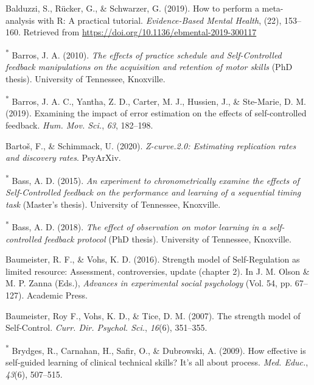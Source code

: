 \documentclass[
  english,
  man, donotrepeattitle,floatsintext]{apa7}
\newlength{\cslhangindent}
\newlength{\cslentryspacingunit} %
\newenvironment{CSLReferences}[2] %
 {%
  \setlength{\parindent}{0pt}
  \ifodd #1
  \let\oldpar\par
  \def\par{\hangindent=\cslhangindent\oldpar}
  \fi
  \setlength{\parskip}{#2\cslentryspacingunit}
 }%
 {}
\begin{document}
\begin{CSLReferences}{1}{0}
\leavevmode{}%
Balduzzi, S., Rücker, G., \& Schwarzer, G. (2019). How to perform a meta-analysis with {R}: A practical tutorial. \emph{Evidence-Based Mental Health}, (22), 153--160. Retrieved from \url{https://doi.org/10.1136/ebmental-2019-300117}

\leavevmode{}%
\textsuperscript{*} Barros, J. A. (2010). \emph{The effects of practice schedule and {Self-Controlled} feedback manipulations on the acquisition and retention of motor skills} (PhD thesis). University of Tennessee, Knoxville.

\leavevmode{}%
\textsuperscript{*} Barros, J. A. C., Yantha, Z. D., Carter, M. J., Hussien, J., \& Ste-Marie, D. M. (2019). Examining the impact of error estimation on the effects of self-controlled feedback. \emph{Hum. Mov. Sci.}, \emph{63}, 182--198.

\leavevmode{}%
Bartoš, F., \& Schimmack, U. (2020). \emph{Z-curve.2.0: Estimating replication rates and discovery rates}. PsyArXiv.

\leavevmode{}%
\textsuperscript{*} Bass, A. D. (2015). \emph{An experiment to chronometrically examine the effects of {Self-Controlled} feedback on the performance and learning of a sequential timing task} (Master's thesis). University of Tennessee, Knoxville.

\leavevmode{}%
\textsuperscript{*} Bass, A. D. (2018). \emph{The effect of observation on motor learning in a self-controlled feedback protocol} (PhD thesis). University of Tennessee, Knoxville.

\leavevmode{}%
Baumeister, R. F., \& Vohs, K. D. (2016). Strength model of {Self-Regulation} as limited resource: Assessment, controversies, update (chapter 2). In J. M. Olson \& M. P. Zanna (Eds.), \emph{Advances in experimental social psychology} (Vol. 54, pp. 67--127). Academic Press.

\leavevmode{}%
Baumeister, Roy F., Vohs, K. D., \& Tice, D. M. (2007). The strength model of {Self-Control}. \emph{Curr. Dir. Psychol. Sci.}, \emph{16}(6), 351--355.

\leavevmode{}%
\textsuperscript{*} Brydges, R., Carnahan, H., Safir, O., \& Dubrowski, A. (2009). How effective is self-guided learning of clinical technical skills? It's all about process. \emph{Med. Educ.}, \emph{43}(6), 507--515.


\end{CSLReferences}
\end{document}
